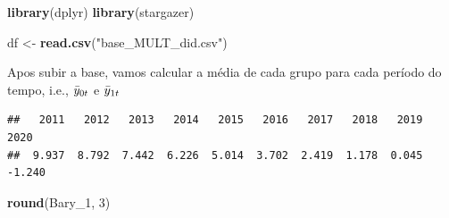 \documentclass[
]{article}
\author{}
\date{\vspace{-2.5em}}
\newenvironment{Shaded}{\begin{snugshade}}{\end{snugshade}}
\newcommand{\ControlFlowTok}[1]{\textcolor[rgb]{0.13,0.29,0.53}{\textbf{#1}}}
\newcommand{\DecValTok}[1]{\textcolor[rgb]{0.00,0.00,0.81}{#1}}
\newcommand{\FunctionTok}[1]{\textcolor[rgb]{0.13,0.29,0.53}{\textbf{#1}}}
\newcommand{\NormalTok}[1]{#1}
\newcommand{\OtherTok}[1]{\textcolor[rgb]{0.56,0.35,0.01}{#1}}
\newcommand{\SpecialCharTok}[1]{\textcolor[rgb]{0.81,0.36,0.00}{\textbf{#1}}}
\newcommand{\StringTok}[1]{\textcolor[rgb]{0.31,0.60,0.02}{#1}}
\begin{document}
\begin{Shaded}
\begin{Highlighting}[]
\FunctionTok{library}\NormalTok{(dplyr)}
\FunctionTok{library}\NormalTok{(stargazer)}

\NormalTok{df }\OtherTok{\textless{}{-}} \FunctionTok{read.csv}\NormalTok{(}\StringTok{"base\_MULT\_did.csv"}\NormalTok{)}
\end{Highlighting}
\end{Shaded}

Apos subir a base, vamos calcular a média de cada grupo para cada
período do tempo, i.e., \(\Bar{y}_{0t}\) e \(\Bar{y}_{1t}\)

\begin{Shaded}
\end{Shaded}

\begin{verbatim}
##   2011   2012   2013   2014   2015   2016   2017   2018   2019   2020 
##  9.937  8.792  7.442  6.226  5.014  3.702  2.419  1.178  0.045 -1.240
\end{verbatim}

\begin{Shaded}
\begin{Highlighting}[]
\FunctionTok{round}\NormalTok{(Bary\_1, }\DecValTok{3}\NormalTok{)}
\end{Highlighting}
\end{Shaded}
\end{document}
